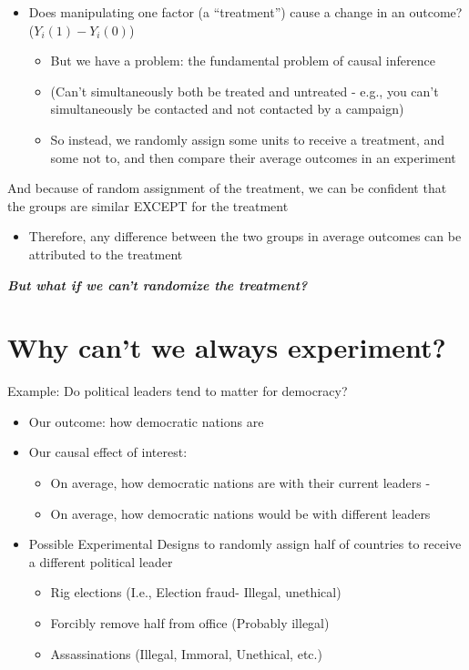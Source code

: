 \documentclass[
  letterpaper,
  DIV=11,
  numbers=noendperiod]{scrreprt}
\providecommand{\tightlist}{%
  \setlength{\itemsep}{0pt}\setlength{\parskip}{0pt}}\usepackage{longtable,booktabs,array}
\begin{document}
\begin{itemize}
\tightlist
\item
  Does manipulating one factor (a ``treatment'') cause a change in an
  outcome? (\(Y_i(1) - Y_i(0)\))

  \begin{itemize}
  \tightlist
  \item
    But we have a problem: the fundamental problem of causal inference
  \item
    (Can't simultaneously both be treated and untreated - e.g., you
    can't simultaneously be contacted and not contacted by a campaign)
  \item
    So instead, we randomly assign some units to receive a treatment,
    and some not to, and then compare their average outcomes in an
    experiment
  \end{itemize}
\end{itemize}

And because of random assignment of the treatment, we can be confident
that the groups are similar EXCEPT for the treatment

\begin{itemize}
\tightlist
\item
  Therefore, any difference between the two groups in average outcomes
  can be attributed to the treatment
\end{itemize}

\textbf{\emph{But what if we can't randomize the treatment?}}

\hypertarget{why-cant-we-always-experiment}{%
\section{Why can't we always
experiment?}\label{why-cant-we-always-experiment}}

Example: Do political leaders tend to matter for democracy?

\begin{itemize}
\tightlist
\item
  Our outcome: how democratic nations are
\item
  Our causal effect of interest:

  \begin{itemize}
  \tightlist
  \item
    On average, how democratic nations are with their current leaders -
  \item
    On average, how democratic nations would be with different leaders
  \end{itemize}
\item
  Possible Experimental Designs to randomly assign half of countries to
  receive a different political leader

  \begin{itemize}
  \tightlist
  \item
    Rig elections (I.e., Election fraud- Illegal, unethical)
  \item
    Forcibly remove half from office (Probably illegal)
  \item
    Assassinations (Illegal, Immoral, Unethical, etc.)
  \end{itemize}
\end{itemize}
\end{document}

